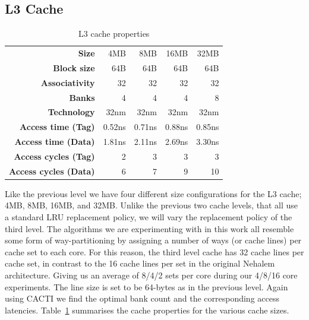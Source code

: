 \subsection{L3 Cache}
\begin{table}[ht]
\centering
\begin{tabular}{rrrrr}
\toprule
\bf{Size}                 & 4MB         & 8MB         & 16MB        & 32MB              \\
\bf{Block size}           & 64B         & 64B         & 64B         & 64B               \\
\bf{Associativity}        & 32          & 32          & 32          & 32                \\
\bf{Banks}                & 4           & 4           & 4           & 8                 \\
\bf{Technology}           & 32nm        & 32nm        & 32nm        & 32nm              \\
\bf{Access time (Tag)}    & 0.52ns      & 0.71ns      & 0.88ns      & 0.85ns            \\
\bf{Access time (Data)}   & 1.81ns      & 2.11ns      & 2.69ns      & 3.30ns            \\
\bf{Access cycles (Tag)}  & 2           & 3           & 3           & 3                 \\
\bf{Access cycles (Data)} & 6           & 7           & 9           & 10                \\
\bottomrule
\end{tabular}
\caption{L3 cache properties}
\label{tbl:processor_model:l3}
\end{table}

Like the previous level we have four different size configurations for the L3 cache; 4MB, 8MB, 16MB, and 32MB.
Unlike the previous two cache levels, that all use a standard LRU replacement policy, we will vary the replacement policy of the third level.
The algorithms we are experimenting with in this work all resemble some form of way-partitioning by assigning a number of ways (or cache lines) per cache set to each core.
For this reason, the third level cache has 32 cache lines per cache set, in contrast to the 16 cache lines per set in the original Nehalem architecture.
Giving us an average of 8/4/2 sets per core during our 4/8/16 core experiments.
The line size is set to be 64-bytes as in the previous level.
Again using CACTI we find the optimal bank count and the corresponding access latencies.
Table~\ref{tbl:processor_model:l3} summarises the cache properties for the various cache sizes.